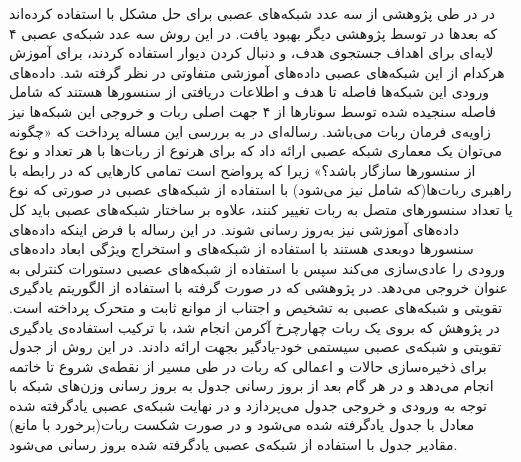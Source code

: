 در  در طی پژوهشی از سه عدد شبکه‌های عصبی برای حل مشکل  با استفاده کرده‌اند که بعدها در  توسط پژوهشی دیگر بهبود یافت. در این روش سه عدد شبکه‌ی عصبی ۴ لایه‌ای برای اهداف جستجوی هدف،  و دنبال کردن دیوار استفاده کردند، برای آموزش هرکدام از این شبکه‌های عصبی داده‌های آموزشی متفاوتی در نظر گرفته شد. داده‌های ورودی این شبکه‌ها فاصله تا هدف و اطلاعات دریافتی از سنسورها هستند که شامل فاصله سنجیده شده توسط سونارها از ۴ جهت اصلی ربات و خروجی این شبکه‌ها نیز زاویه‌ی فرمان ربات می‌باشد.
رساله‌ای در  به بررسی این مساله پرداخت که «چگونه می‌توان یک معماری شبکه عصبی ارائه داد که برای هرنوع از ربات‌ها با هر تعداد و نوع از سنسورها سازگار باشد؟» زیرا که پرواضح است تمامی کارهایی که در رابطه با راهبری ربات‌ها(که شامل  نیز می‌شود) با استفاده از شبکه‌های عصبی در صورتی که نوع یا تعداد سنسورهای متصل به ربات تغییر کنند، علاوه بر ساختار شبکه‌های عصبی باید کل داده‌های آموزشی نیز به‌روز رسانی شوند. در این رساله با فرض اینکه داده‌های سنسورها دوبعدی هستند با استفاده از شبکه‌های  و استخراج ویژگی  ابعاد داده‌های ورودی را عادی‌سازی می‌کند سپس با استفاده از شبکه‌های عصبی دستورات کنترلی به عنوان خروجی می‌دهد.
در پژوهشی که در  صورت گرفته با استفاده از الگوریتم یادگیری تقویتی  و شبکه‌های عصبی به تشخیص و اجتناب از موانع ثابت و متحرک پرداخته است. در پژوهش که بروی یک ربات چهارچرخ آکرمن انجام شد، با ترکیب استفاده‌ی یادگیری تقویتی و شبکه‌ی عصبی سیستمی خود-یادگیر بجهت  ارائه دادند. در این روش از جدول  برای ذخیره‌سازی حالات و اعمالی که ربات در طی مسیر از نقطه‌ی شروع تا خاتمه انجام می‌دهد و در هر گام بعد از بروز رسانی جدول  به بروز رسانی وزن‌های شبکه با توجه به ورودی و خروجی جدول  می‌پردازد و در نهایت شبکه‌ی عصبی یادگرفته شده معادل با جدول یادگرفته شده  می‌شود و در صورت شکست ربات(برخورد با مانع) مقادیر جدول  با استفاده از شبکه‌ی عصبی یادگرفته شده بروز رسانی می‌شود.